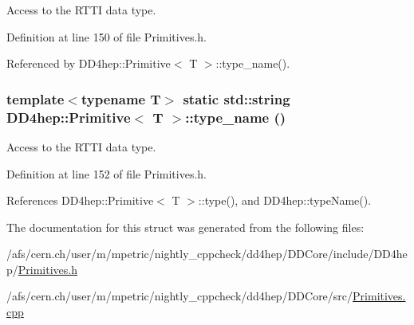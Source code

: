 Access to the RTTI data type. 

Definition at line 150 of file Primitives.h.

Referenced by DD4hep::Primitive$<$ T $>$::type\_\-name().\hypertarget{struct_d_d4hep_1_1_primitive_adc0e54033e0242d525537cfa2900f3b8}{
\subsubsection[{type\_\-name}]{\setlength{\rightskip}{0pt plus 5cm}template$<$typename T$>$ static std::string {\bf DD4hep::Primitive}$<$ {\bf T} $>$::type\_\-name ()}}
\label{struct_d_d4hep_1_1_primitive_adc0e54033e0242d525537cfa2900f3b8}


Access to the RTTI data type. 

Definition at line 152 of file Primitives.h.

References DD4hep::Primitive$<$ T $>$::type(), and DD4hep::typeName().

The documentation for this struct was generated from the following files:\begin{DoxyCompactItemize}
\item 
/afs/cern.ch/user/m/mpetric/nightly\_\-cppcheck/dd4hep/DDCore/include/DD4hep/\hyperlink{_primitives_8h}{Primitives.h}\item 
/afs/cern.ch/user/m/mpetric/nightly\_\-cppcheck/dd4hep/DDCore/src/\hyperlink{_primitives_8cpp}{Primitives.cpp}\end{DoxyCompactItemize}
